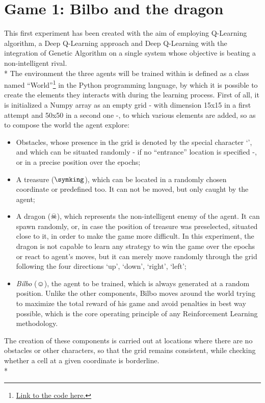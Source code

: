 \section{Game 1: Bilbo and the dragon}
This first experiment has been created with the aim of employing Q-Learning algorithm, a Deep Q-Learning approach and Deep Q-Learning with the integration of Genetic Algorithm on a single system whose objective is beating a non-intelligent rival.\\*
The environment the three agents will be trained within is defined as a class named ``World''\footnote{\href{https://github.com/moiraghif/DragonHunting/blob/master/Bilbo\%20World/CreateBilboWorld.py}{Link to the code here.}} in the Python programming language, by which it is possible to create the elements they interacts with during the learning process. First of all, it is initialized a Numpy array as an empty grid - with dimension 15x15 in a first attempt and 50x50 in a second one -, to which various elements are added, so as to compose the world the agent explore:
\begin{itemize}[noitemsep, topsep=0ex]
  \item Obstacles, whose presence in the grid is denoted by the special character `', and which can be situated randomly - if no ``entrance'' location is specified -, or in a precise position over the epochs;
  \item A treasure ($\symking$), which can be located in a randomly chosen coordinate or predefined too. It can not be moved, but only caught by the agent;
  \item A dragon ($\skull$), which represents the non-intelligent enemy of the agent. It can spawn randomly, or, in case the position of treasure was preselected, situated close to it, in order to make the game more difficult. In this experiment, the dragon is not capable to learn any strategy to win the game over the epochs or react to agent's moves, but it can merely move randomly through the grid following the four directions `up', `down', `right', `left';
  \item \textit{Bilbo} ($\smiley$), the agent to be trained, which is always generated at a random position. Unlike the other components, Bilbo moves around the world trying to maximize the total reward of his game and avoid penalties in best way possible, which is the core operating principle of any Reinforcement Learning methodology.
\end{itemize}
The creation of these components is carried out at locations where there are no obstacles or other characters, so that the grid remains consistent, while checking whether a cell at a given coordinate is borderline.\\*
